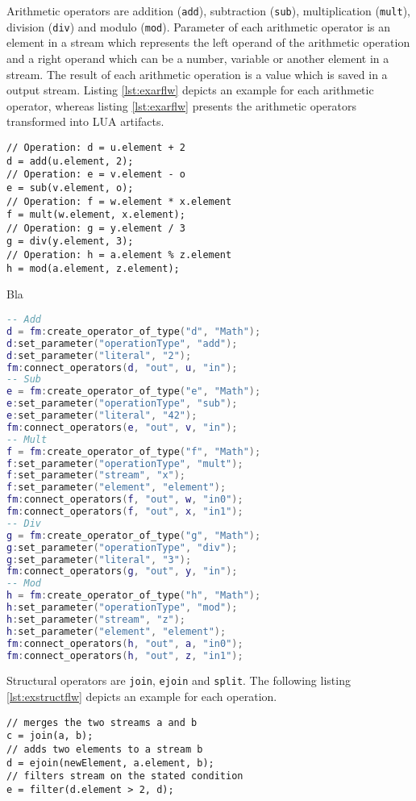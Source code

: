 Arithmetic operators are addition (\texttt{add}), subtraction 
(\texttt{sub}), multiplication (\texttt{mult}), division (\texttt{div}) and
modulo (\texttt{mod}). Parameter of each arithmetic operator is an element in
a stream which represents the left operand of the arithmetic operation and
a right operand which can be a number, variable or another element in a stream. 
The result of each arithmetic operation is a value which is saved in a output
stream. Listing \ref{lst:exarflw} depicts an example for each arithmetic 
operator, whereas listing \ref{lst:exarflw} presents the arithmetic operators 
transformed into LUA artifacts.
\begin{lstlisting}[language=Flow, caption={\emph{Examples of Arithmetic Operators in Flow}},label={lst:exarflw}]
// Operation: d = u.element + 2
d = add(u.element, 2);
// Operation: e = v.element - o
e = sub(v.element, o);
// Operation: f = w.element * x.element
f = mult(w.element, x.element);
// Operation: g = y.element / 3
g = div(y.element, 3);
// Operation: h = a.element % z.element
h = mod(a.element, z.element); 
\end{lstlisting}
Bla
\begin{lstlisting}[language=LUA, caption={\emph{Examples of Arithmetic Operators in LUA}},label={lst:exanlua}]
-- Add
d = fm:create_operator_of_type("d", "Math");
d:set_parameter("operationType", "add");
d:set_parameter("literal", "2");
fm:connect_operators(d, "out", u, "in");
-- Sub
e = fm:create_operator_of_type("e", "Math");
e:set_parameter("operationType", "sub");
e:set_parameter("literal", "42");
fm:connect_operators(e, "out", v, "in");
-- Mult
f = fm:create_operator_of_type("f", "Math");
f:set_parameter("operationType", "mult");
f:set_parameter("stream", "x");
f:set_parameter("element", "element");
fm:connect_operators(f, "out", w, "in0");
fm:connect_operators(f, "out", x, "in1");
-- Div
g = fm:create_operator_of_type("g", "Math");
g:set_parameter("operationType", "div");
g:set_parameter("literal", "3");
fm:connect_operators(g, "out", y, "in");
-- Mod
h = fm:create_operator_of_type("h", "Math");
h:set_parameter("operationType", "mod");
h:set_parameter("stream", "z");
h:set_parameter("element", "element");
fm:connect_operators(h, "out", a, "in0");
fm:connect_operators(h, "out", z, "in1");
\end{lstlisting}
Structural operators are \texttt{join}, \texttt{ejoin} and \texttt{split}. The
following listing \ref{lst:exstructflw} depicts an example for each operation.
\begin{lstlisting}[language=Flow, caption={\emph{Examples of Structural Operators \texttt{join},  \texttt{ejoin} and  \texttt{filter} in Flow}},label={lst:exstructflw}]
// merges the two streams a and b
c = join(a, b);
// adds two elements to a stream b
d = ejoin(newElement, a.element, b);	
// filters stream on the stated condition
e = filter(d.element > 2, d);
\end{lstlisting}
